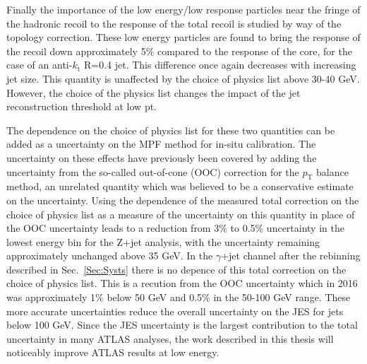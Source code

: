 Finally the importance of the low energy/low response particles near the fringe of the hadronic recoil to the response of the total recoil is studied by way of the topology correction.  
These low energy particles are found to bring the response of the recoil down approximately 5\% compared to the response of the core, for the case of an anti-$k_\mathrm{t}$ R=0.4 jet.  
This difference once again decreases with increasing jet size.  
This quantity is unaffected by the choice of physics list above 30-40 GeV. 
However, the choice of the physics list changes the impact of the jet reconstruction threshold at low pt.  

The dependence on the choice of physics list for these two quantities can be added as a uncertainty on the MPF method for in-situ calibration.  
The uncertainty on these effects have previously been covered by adding the uncertainty from the so-called out-of-cone (OOC) correction for the $p_{\mathrm{T}}$ balance method, an unrelated quantity which was believed to be a conservative estimate on the uncertainty.  
Using the dependence of the measured total correction on the choice of physics list as a measure of the uncertainty on this quantity in place of the OOC uncertainty leads to a reduction from 3\% to 0.5\% uncertainty in the lowest energy bin for the Z+jet analysis, with the uncertainty remaining approximately unchanged above 35 GeV.  
In the $\gamma$+jet channel after the rebinning described in Sec.~\ref{Sec:Systs} there is no depence of this total correction on the choice of physics list.  
This is a recution from the OOC uncertainty which in 2016 was approximately 1\% below 50 GeV and 0.5\% in the 50-100 GeV range.  
These more accurate uncertainties reduce the overall uncertainty on the JES for jets below 100 GeV.  
Since the JES uncertainty is the largest contribution to the total uncertainty in many ATLAS analyses, the work described in this thesis will noticeably improve ATLAS results at low energy.

 



